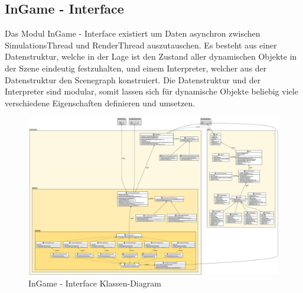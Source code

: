 \subsection{InGame - Interface}

Das Modul InGame - Interface existiert um Daten asynchron zwischen SimulationsThread und RenderThread auszutauschen.
Es besteht aus einer Datenstruktur, welche in der Lage ist den Zustand aller dynamischen Objekte in der Szene eindeutig festzuhalten,
und einem Interpreter, welcher aus der Datenstruktur den Scenegraph konstruiert.
Die Datenstruktur und der Interpreter sind modular, somit lassen sich für dynamische Objekte beliebig viele verschiedene Eigenschaften definieren
und umsetzen.

\begin{figure}[htbp]
    \centering
    \includegraphics[width=\linewidth]{Interface/modul.eps}
    \caption{InGame - Interface Klassen-Diagram}
\end{figure}

\pagebreak